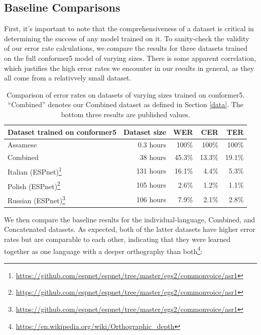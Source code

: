\documentclass{article}
\begin{document}
  \subsection{Baseline Comparisons} \label{results-baseline-comparisons}
  First, it's important to note that the comprehensiveness of a dataset is critical in determining the success of any model trained on it. To sanity-check the validity of our error rate calculations, we compare the results for three datasets trained on the full conformer5 model of varying sizes. There is some apparent correlation, which justifies the high error rates we encounter in our results in general, as they all come from a relativvely small dataset.
  \begin{table}
    \begin{center}
      \begin{tabular}{lrrrr}
        \toprule
        Dataset trained on conformer5                                                                       & Dataset size & WER    & CER    & TER \\\midrule
        Assamese                                                                                            & 0.3 hours    & 100\%  & 100\%  & 100\% \\
        Combined                                                                                            & 38 hours     & 45.3\% & 13.3\% & 19.1\% \\
        Italian (ESPnet)\footnote{\url{https://github.com/espnet/espnet/tree/master/egs2/commonvoice/asr1}} & 131 hours    & 16.1\% & 4.4\%  & 5.3\% \\
        Polish (ESPnet)\footnote{\url{https://github.com/espnet/espnet/tree/master/egs2/commonvoice/asr1}}  & 105 hours    & 2.6\%  & 1.2\%  & 1.1\% \\
        Russian (ESPnet)\footnote{\url{https://github.com/espnet/espnet/tree/master/egs2/commonvoice/asr1}} & 106 hours    & 7.9\%  & 2.1\%  & 2.8\% \\\bottomrule
      \end{tabular}
    \end{center}
    \caption{Comparison of error rates on datasets of varying sizes trained on conformer5. ``Combined'' denotes our Combined dataset as defined in Section \ref{data}. The bottom three results are published values.}
    \label{table-conformer5-results}
  \end{table}
  We then compare the baseline results for the individual-language, Combined, and Concatenated datasets. As expected, both of the latter datasets have higher error rates but are comparable to each other, indicating that they were learned together as one language with a deeper orthography than both\footnote{\url{https://en.wikipedia.org/wiki/Orthographic_depth}}:
\end{document}

